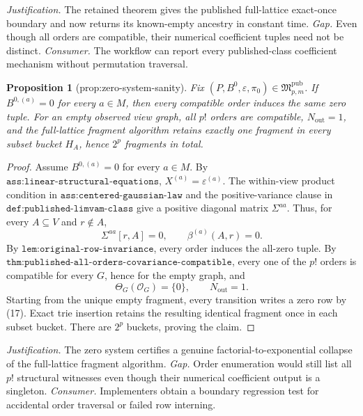 \documentclass{article}
\newtheorem{proposition}{Proposition}
\begin{document}
\par\smallskip\noindent \textit{Justification.} The retained theorem gives the published full-lattice exact-once boundary and now returns its known-empty ancestry in constant time. \textit{Gap.} Even though all orders are compatible, their numerical coefficient tuples need not be distinct. \textit{Consumer.} The workflow can report every published-class coefficient mechanism without permutation traversal.

\begin{proposition}[prop:zero-system-sanity]\label{prop:zero-system-sanity}
Fix \((P,B^0,\varepsilon,\pi_0)\in\mathfrak M_{p,m}^{\mathrm{pub}}\). If \(B^{0,(a)}=0\) for every \(a\in M\), then every compatible order induces the same zero tuple. For an empty observed view graph, all \(p!\) orders are compatible, \(N_{\mathrm{out}}=1\), and the full-lattice fragment algorithm retains exactly one fragment in every subset bucket \(H_A\), hence \(2^p\) fragments in total.
\end{proposition}
\begin{proof}
Assume \(B^{0,(a)}=0\) for every \(a\in M\).  By \(\texttt{ass:linear-structural-equations}\), \(X^{(a)}=\varepsilon^{(a)}\).  The within-view product condition in \(\texttt{ass:centered-gaussian-law}\) and the positive-variance clause in \(\texttt{def:published-limvam-class}\) give a positive diagonal matrix \(\Sigma^{aa}\).  Thus, for every \(A\subseteq V\) and \(r\notin A\),
\[
 \Sigma^{aa}[r,A]=0,
 \qquad \beta^{(a)}(A,r)=0.
 \tag{17}
\]
By \(\texttt{lem:original-row-invariance}\), every order induces the all-zero tuple.  By \(\texttt{thm:published-all-orders-covariance-compatible}\), every one of the \(p!\) orders is compatible for every \(G\), hence for the empty graph, and
\[
 \Theta_G(\mathcal O_G)=\{0\},
 \qquad N_{\mathrm{out}}=1.
\]
Starting from the unique empty fragment, every transition writes a zero row by (17).  Exact trie insertion retains the resulting identical fragment once in each subset bucket.  There are \(2^p\) buckets, proving the claim.
\end{proof}
\par\smallskip\noindent \textit{Justification.} The zero system certifies a genuine factorial-to-exponential collapse of the full-lattice fragment algorithm. \textit{Gap.} Order enumeration would still list all \(p!\) structural witnesses even though their numerical coefficient output is a singleton. \textit{Consumer.} Implementers obtain a boundary regression test for accidental order traversal or failed row interning.
\end{document}
